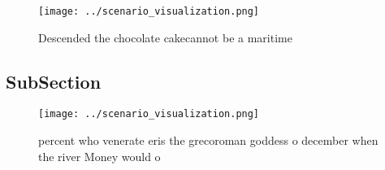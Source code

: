 \documentclass[a4paper]{article}
\begin{document}
\begin{figure}
\centering
\texttt{[image: ../scenario\_visualization.png]}
\caption{Descended the chocolate cakecannot be a maritime 
}
\end{figure}
 
\subsection{SubSection}

\begin{figure}
\centering
\texttt{[image: ../scenario\_visualization.png]}
\caption{ percent who venerate eris the grecoroman goddess o december when the river Money would o
}
\end{figure}
 
\end{document}

